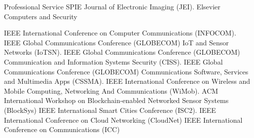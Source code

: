 \begin{rubric}{Professional Service}
\entry*[]
SPIE Journal of Electronic Imaging (JEI).
%
\entry*[]
Elsevier Computers and Security


%
\entry*[]
IEEE International Conference on Computer Communications (INFOCOM).
%
\entry*[]
IEEE Global Communications Conference (GLOBECOM) IoT and Sensor Networks (IoTSN).
%
\entry*[]
IEEE Global Communications Conference (GLOBECOM) Communication and Information Systems Security (CISS).
%
\entry*[]
IEEE Global Communications Conference (GLOBECOM) Communications Software, Services and Multimedia Apps (CSSMA).
%
\entry*[]
IEEE International Conference on Wireless and Mobile Computing, Networking And Communications
(WiMob).
%
\entry*[]
ACM International Workshop on Blockchain-enabled Networked Sensor Systems (BlockSys)
%
\entry*[] 
IEEE International Smart Cities Conference (ISC2).
%
\entry*[] 
IEEE International Conference on Cloud Networking (CloudNet)
%
\entry*[] 
IEEE International Conference on Communications (ICC)
%
\end{rubric}